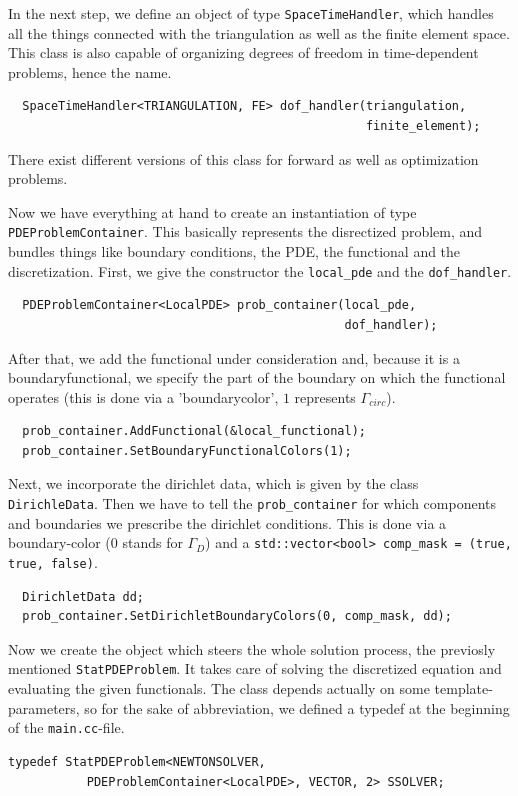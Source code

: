 \documentclass[prodmode,acmtoms]{acmsmall}
\numberwithin{equation}{section}
\begin{document}
In the next step, we define an object of type \texttt{SpaceTimeHandler}, which handles all the things connected with the triangulation as well as the finite element space. This class is also capable of organizing degrees of freedom in time-dependent problems, hence the name. 
\begin{lstlisting}
  SpaceTimeHandler<TRIANGULATION, FE> dof_handler(triangulation,
                                                  finite_element);
\end{lstlisting}
There exist different versions of this class for forward as well as optimization problems. 

Now we have everything at hand to create an instantiation of type \texttt{PDEProblemContainer}. This basically represents the disrectized problem, and bundles things like boundary conditions, the PDE, the functional and the discretization. First, we give the constructor the \texttt{local\_pde} and the \texttt{dof\_handler}.
\begin{lstlisting}
  PDEProblemContainer<LocalPDE> prob_container(local_pde,
                                               dof_handler);
\end{lstlisting}
After that, we add the functional under consideration and, because it is a boundaryfunctional, we specify the part of the boundary on which the functional operates (this is done via a 'boundarycolor', $1$ represents $\Gamma_{circ}$).
\begin{lstlisting}
  prob_container.AddFunctional(&local_functional);
  prob_container.SetBoundaryFunctionalColors(1);
\end{lstlisting}
Next, we incorporate the dirichlet data, which is given by the class \texttt{DirichleData}. Then we have to tell the \texttt{prob\_container} for which components and boundaries we prescribe the dirichlet conditions. This is done via a boundary-color (0 stands for $\Gamma_D$) and a \texttt{std::vector<bool> comp\_mask = (true, true, false)}.
\begin{lstlisting}
  DirichletData dd;
  prob_container.SetDirichletBoundaryColors(0, comp_mask, dd);
\end{lstlisting}
Now we create the object which steers the whole solution process, the previosly mentioned \texttt{StatPDEProblem}. It takes care of solving the discretized equation and evaluating the given functionals. The class depends actually on some template-parameters, so for the sake of abbreviation, we defined a typedef at the beginning of the \texttt{main.cc}-file.
\begin{lstlisting}
typedef StatPDEProblem<NEWTONSOLVER,
           PDEProblemContainer<LocalPDE>, VECTOR, 2> SSOLVER;
\end{lstlisting}
\end{document}
